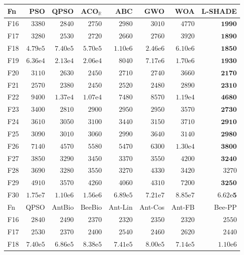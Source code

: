 \begin{tabular}{lrrrrrrr}
\toprule
Fn & PSO & QPSO & ACO$_\mathbb{R}$ & ABC & GWO & WOA & L-SHADE \\
\midrule
F16 & $3380$ & $2840$ & $2750$ & $2980$ & $3010$ & $4770$ & $\mathbf{1990}$ \\
F17 & $3280$ & $2530$ & $2720$ & $2660$ & $2760$ & $3920$ & $\mathbf{1890}$ \\
F18 & $4.79\mathrm{e}{5}$ & $7.40\mathrm{e}{5}$ & $5.70\mathrm{e}{5}$ & $1.10\mathrm{e}{6}$ & $2.46\mathrm{e}{6}$ & $6.10\mathrm{e}{6}$ & $\mathbf{1850}$ \\
F19 & $6.36\mathrm{e}{4}$ & $2.13\mathrm{e}{4}$ & $2.06\mathrm{e}{4}$ & $8040$ & $7.17\mathrm{e}{6}$ & $1.70\mathrm{e}{6}$ & $\mathbf{1930}$ \\
F20 & $3110$ & $2630$ & $2450$ & $2710$ & $2740$ & $3660$ & $\mathbf{2170}$ \\
F21 & $2570$ & $2380$ & $2450$ & $2520$ & $2480$ & $2890$ & $\mathbf{2310}$ \\
F22 & $9400$ & $1.37\mathrm{e}{4}$ & $1.07\mathrm{e}{4}$ & $7480$ & $8570$ & $1.19\mathrm{e}{4}$ & $\mathbf{4680}$ \\
F23 & $3400$ & $2810$ & $2900$ & $2950$ & $2950$ & $3570$ & $\mathbf{2730}$ \\
F24 & $3610$ & $3050$ & $3100$ & $3440$ & $3150$ & $3710$ & $\mathbf{2910}$ \\
F25 & $3090$ & $3010$ & $3060$ & $2990$ & $3640$ & $3140$ & $\mathbf{2980}$ \\
F26 & $7140$ & $4570$ & $5580$ & $5470$ & $6300$ & $1.30\mathrm{e}{4}$ & $\mathbf{3800}$ \\
F27 & $3850$ & $3290$ & $3450$ & $3370$ & $3550$ & $4200$ & $\mathbf{3240}$ \\
F28 & $3690$ & $3280$ & $3550$ & $3270$ & $4330$ & $3420$ & $3270$ \\
F29 & $4910$ & $3570$ & $4260$ & $4060$ & $4310$ & $7200$ & $\mathbf{3250}$ \\
F30 & $1.75\mathrm{e}{7}$ & $1.10\mathrm{e}{6}$ & $1.56\mathrm{e}{6}$ & $6.89\mathrm{e}{5}$ & $7.21\mathrm{e}{7}$ & $8.85\mathrm{e}{7}$ & $\mathbf{6.62\mathrm{e}{5}}$ \\
\midrule
Fn & QPSO & AntBio & BeeBio & Ant-Lin & Ant-Cos & Ant-FB & Bee-PP \\
\midrule
F16 & $2840$ & $2490$ & $2370$ & $2320$ & $2350$ & $2320$ & $2550$ \\
F17 & $2530$ & $2370$ & $2400$ & $2540$ & $2460$ & $2620$ & $2440$ \\
F18 & $7.40\mathrm{e}{5}$ & $6.86\mathrm{e}{5}$ & $8.38\mathrm{e}{5}$ & $7.41\mathrm{e}{5}$ & $8.00\mathrm{e}{5}$ & $7.14\mathrm{e}{5}$ & $1.10\mathrm{e}{6}$ \\

\end{tabular}
